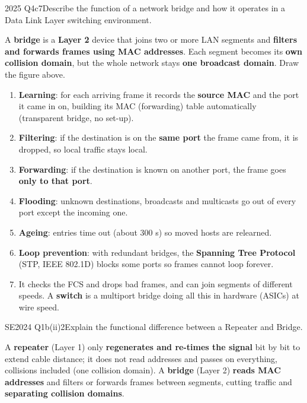 \documentclass[10pt]{article}
\begin{document}
\begin{pastq}{2025 Q4c}{7}Describe the function of a network bridge and how it operates in a Data Link Layer switching environment.\end{pastq}
\begin{ans}
A \textbf{bridge} is a \textbf{Layer 2} device that joins two or more LAN segments and \textbf{filters and forwards frames using MAC addresses}. Each segment becomes its \textbf{own collision domain}, but the whole network stays \textbf{one broadcast domain}. Draw the figure above.
\begin{enumerate}
\item \textbf{Learning}: for each arriving frame it records the \textbf{source MAC} and the port it came in on, building its MAC (forwarding) table automatically (transparent bridge, no set-up).
\item \textbf{Filtering}: if the destination is on the \textbf{same port} the frame came from, it is dropped, so local traffic stays local.
\item \textbf{Forwarding}: if the destination is known on another port, the frame goes \textbf{only to that port}.
\item \textbf{Flooding}: unknown destinations, broadcasts and multicasts go out of every port except the incoming one.
\item \textbf{Ageing}: entries time out (about 300 s) so moved hosts are relearned.
\item \textbf{Loop prevention}: with redundant bridges, the \textbf{Spanning Tree Protocol} (STP, IEEE 802.1D) blocks some ports so frames cannot loop forever.
\item It checks the FCS and drops bad frames, and can join segments of different speeds. A \textbf{switch} is a multiport bridge doing all this in hardware (ASICs) at wire speed.
\end{enumerate}
\end{ans}

\begin{pastq}{SE2024 Q1b(ii)}{2}Explain the functional difference between a Repeater and Bridge.\end{pastq}
\begin{ans}
A \textbf{repeater} (Layer 1) only \textbf{regenerates and re-times the signal} bit by bit to extend cable distance; it does not read addresses and passes on everything, collisions included (one collision domain).
A \textbf{bridge} (Layer 2) \textbf{reads MAC addresses} and filters or forwards frames between segments, cutting traffic and \textbf{separating collision domains}.
\end{ans}
\end{document}
